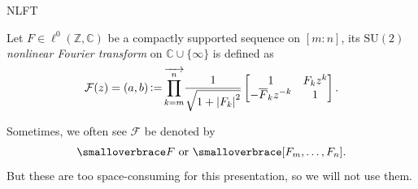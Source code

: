 \begin{frame}{NLFT}
    \begin{definition}
        Let $F\in\ell^0(\mathbb{Z},\mathbb{C})$ be a compactly supported sequence on $[m:n]$, its $\mathrm{SU}(2)$ \textit{nonlinear Fourier transform} on $\mathbb{C}\cup\{\infty\}$ is defined as
        \begin{equation}
            \mathcal{F}(z) = (a,b) \operatorname{\vcentcolon=} \overrightarrow{\prod_{k=m}^n} \frac{1}{\sqrt{1+\left|{F_k}\right|^2}} \left[\begin{matrix}
                1 & F_kz^k \\ -\overline{F}_kz^{-k} & 1
            \end{matrix}\right].
        \end{equation}
    \end{definition}
    Sometimes, we often see $\mathcal{F}$ be denoted by
    \begin{equation*}
        \NLFT{F} \text{ or } \NLFT{[F_{m},\ldots,F_{n}]}.
    \end{equation*}
    But these are too space-consuming for this presentation, so we will not use them.
\end{frame}

